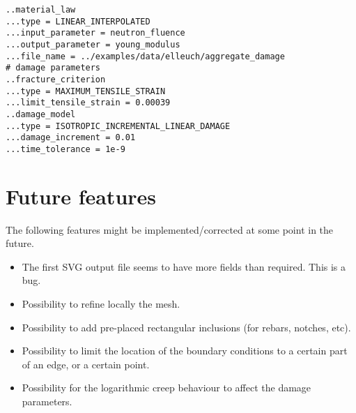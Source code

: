 \documentclass[10pt]{article}
\begin{document}
\verb+..material_law+\\
\verb+...type = LINEAR_INTERPOLATED+\\
\verb+...input_parameter = neutron_fluence+\\
\verb+...output_parameter = young_modulus+\\
\verb+...file_name = ../examples/data/elleuch/aggregate_damage+\\
\verb+# damage parameters+\\
\verb+..fracture_criterion+\\
\verb+...type = MAXIMUM_TENSILE_STRAIN+\\
\verb+...limit_tensile_strain = 0.00039+\\
\verb+..damage_model+\\
\verb+...type = ISOTROPIC_INCREMENTAL_LINEAR_DAMAGE+\\
\verb+...damage_increment = 0.01+\\
\verb+...time_tolerance = 1e-9+

\section{Future features}

The following features might be implemented/corrected at some point in the future.

\begin{itemize}
	\item The first SVG output file seems to have more fields than required. This is a bug.
	\item Possibility to refine locally the mesh.
	\item Possibility to add pre-placed rectangular inclusions (for rebars, notches, etc).
	\item Possibility to limit the location of the boundary conditions to a certain part of an edge, or a certain point.
	\item Possibility for the logarithmic creep behaviour to affect the damage parameters.
\end{itemize}
\end{document}
